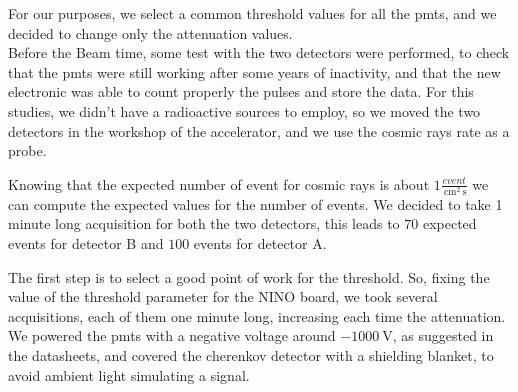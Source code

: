 For our purposes, we select a common threshold values for all the pmts, and we decided to change only the attenuation values.\\
Before the Beam time, some test with the two detectors were performed, to check that the pmts were still working after some years of inactivity, and that the new electronic was able to count properly the pulses and store the data. For this studies, we didn't have a radioactive sources to employ, so we moved the two detectors in the workshop of the accelerator, and we use the cosmic rays rate as a probe. 

Knowing that the expected number of event for cosmic rays is about $1 \frac{event}{\SI{}{\centi \meter\squared} \SI{}{\second}}$ we can compute the expected values for the number of events. We decided to take 1 minute long acquisition for both the two detectors, this leads to $70$ expected events for detector B  and  $100$ events for detector A.  \smallskip

The first step is to select a good point of work for the threshold. So, fixing the value of the threshold parameter for the NINO board, we took several acquisitions, each of them one minute long, increasing each time the attenuation. We powered the pmts with a negative voltage around $ \SI{-1000}{\volt}$, as suggested in the datasheets, and covered the cherenkov detector with a shielding blanket, to avoid ambient light simulating a signal.

\begin{figure}[hbtp]
\centering
{}
\end{figure}

